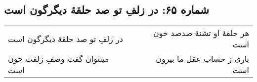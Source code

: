\begin{center}
\section*{شماره ۶۵: در زلفِ تو صد حلقۀ دیگرگون است}
\label{sec:065}
\begin{longtable}{l p{0.5cm} r}
در زلفِ تو صد حلقهٔ دیگرگون است
&&
هر حلقهٔ او تشنهٔ صدصد خون است
\\
مینتوان گفت وصفِ زلفت چون است
&&
باری ز حساب عقل ما بیرون است
\\
\end{longtable}
\end{center}
